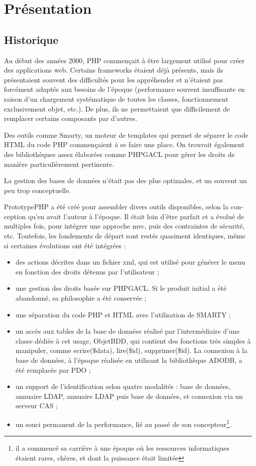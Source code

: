 \chapter{Présentation}
\section{Historique}
Au début des années 2000, PHP commençait à être largement utilisé pour créer des applications web. Certains frameworks étaient déjà présents, mais ils présentaient souvent des difficultés pour les appréhender et n'étaient pas forcément adaptés aux besoins de l'époque (performance souvent insuffisante en raison d'un chargement systématique de toutes les classes, fonctionnement exclusivement objet, etc.). De plus, ils ne permettaient que difficilement de remplacer certains composants par d'autres.

Des outils comme Smarty, un moteur de templates qui permet de séparer le code HTML du code PHP commençaient à se faire une place. On trouvait également des bibliothèques assez élaborées comme PHPGACL pour gérer les droits de manière particulièrement pertinente.

La gestion des bases de données n'était pas des plus optimales, et un souvent un peu trop conceptuelle.

PrototypePHP a été créé pour assembler divers outils disponibles, selon la con-ception qu'en avait l'auteur à l'époque. Il était loin d'être parfait et a évolué de multiples fois, pour intégrer une approche mvc, puis des contraintes de sécurité, etc. Toutefois, les fondements de départ sont restés quasiment identiques, même si certaines évolutions ont été intégrées :
\begin{itemize}
\item des actions décrites dans un fichier xml, qui est utilisé pour générer le menu en fonction des droits détenus par l'utilisateur ;
\item une gestion des droits basée sur PHPGACL. Si le produit initial a été abandonné, sa philosophie a été conservée ;
\item une séparation du code PHP et HTML avec l'utilisation de SMARTY ;
\item un accès aux tables de la base de données réalisé par l'intermédiaire d'une classe dédiée à cet usage, ObjetBDD, qui contient des fonctions très simples à manipuler, comme ecrire(\$data), lire(\$id), supprimer(\$id). La connexion à la base de données, à l'époque réalisée en utilisant la bibliothèque ADODB, a été remplacée par PDO ;
\item un support de l'identification selon quatre modalités : base de données, annuaire LDAP, annuaire LDAP puis base de données, et connexion via un serveur CAS ;
\item un souci permanent de la performance, lié au passé de son concepteur\footnote{il a commencé sa carrière à une époque où les ressources informatiques étaient rares, chères, et dont la puissance était limitée}.
\end{itemize}

